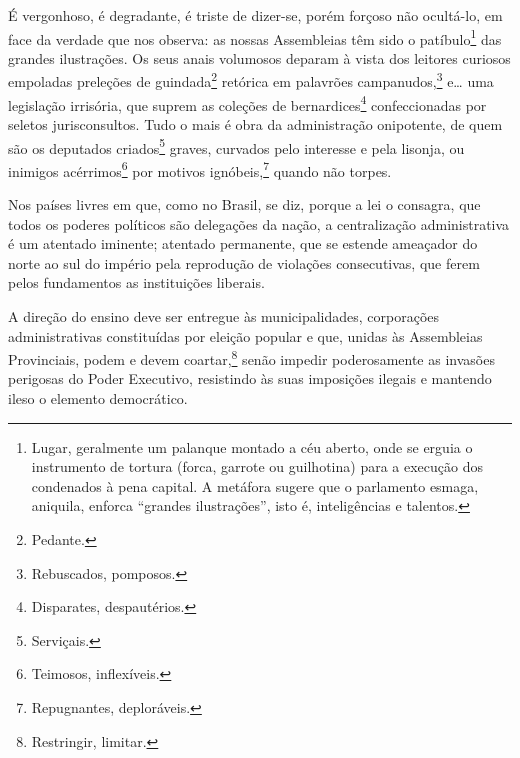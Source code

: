 É vergonhoso, é degradante, é triste de dizer-se, porém forçoso não
ocultá-lo, em face da verdade que nos observa: as nossas Assembleias têm
sido o patíbulo\footnote{Lugar, geralmente um palanque montado a céu
  aberto, onde se erguia o instrumento de tortura (forca, garrote ou
  guilhotina) para a execução dos condenados à pena capital. A metáfora
  sugere que o parlamento esmaga, aniquila, enforca ``grandes
  ilustrações'', isto é, inteligências e talentos.} das grandes
ilustrações. Os seus anais volumosos deparam à vista dos leitores
curiosos empoladas preleções de guindada\footnote{Pedante.} retórica
em palavrões campanudos,\footnote{Rebuscados, pomposos.} e\ldots{} uma
legislação irrisória, que suprem as coleções de bernardices\footnote{
  Disparates, despautérios.} confeccionadas por seletos jurisconsultos.
Tudo o mais é obra da administração onipotente, de quem são os deputados
criados\footnote{Serviçais.} graves, curvados pelo interesse e pela
lisonja, ou inimigos acérrimos\footnote{Teimosos, inflexíveis.} por
motivos ignóbeis,\footnote{Repugnantes, deploráveis.} quando não
torpes.

Nos países livres em que, como no Brasil, se diz, porque a lei o
consagra, que todos os poderes políticos são delegações da nação, a
centralização administrativa é um atentado iminente; atentado
permanente, que se estende ameaçador do norte ao sul do império pela
reprodução de violações consecutivas, que ferem pelos fundamentos as
instituições liberais.

A direção do ensino deve ser entregue às municipalidades, corporações
administrativas constituídas por eleição popular e que, unidas às
Assembleias Provinciais, podem e devem coartar,\footnote{Restringir, limitar.} senão impedir poderosamente as invasões perigosas do Poder Executivo, resistindo às
suas imposições ilegais e mantendo ileso o elemento democrático.

